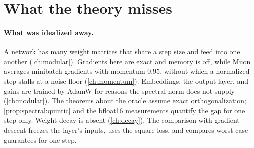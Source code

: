 \begin{refsection}
\begin{figure}[t]
\label{fig:spectral:crossover}
\end{figure}

\section{What the theory misses}\label{sec:spectral:misses}

\paragraph{What was idealized away.} A network has many weight matrices that share a step size and feed into one another (\cref{ch:modular}). Gradients here are exact and memory is off, while Muon averages minibatch gradients with momentum $0.95$, without which a normalized step stalls at a noise floor (\cref{ch:momentum}). Embeddings, the output layer, and gains are trained by AdamW for reasons the spectral norm does not supply (\cref{ch:modular}). The theorems about the oracle assume exact orthogonalization; \cref{prop:spectral:quintic} and the bfloat16 measurements quantify the gap for one step only. Weight decay is absent (\cref{ch:decay}). The comparison with gradient descent freezes the layer's inputs, uses the square loss, and compares worst-case guarantees for one step.


\end{refsection}
